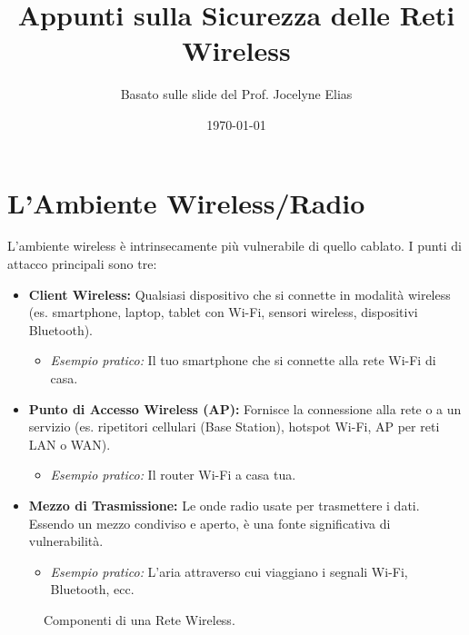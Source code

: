 \documentclass{article}
\title{Appunti sulla Sicurezza delle Reti Wireless}
\author{Basato sulle slide del Prof. Jocelyne Elias}
\date{\today}
\begin{document}
\maketitle
\tableofcontents
\newpage


\section{L'Ambiente Wireless/Radio}
L'ambiente wireless è intrinsecamente più vulnerabile di quello cablato. I punti di attacco principali sono tre:

\begin{itemize}
    \item \textbf{Client Wireless:} Qualsiasi dispositivo che si connette in modalità wireless (es. smartphone, laptop, tablet con Wi-Fi, sensori wireless, dispositivi Bluetooth).
    \begin{itemize}
        \item \textit{Esempio pratico:} Il tuo smartphone che si connette alla rete Wi-Fi di casa.
    \end{itemize}
    \item \textbf{Punto di Accesso Wireless (AP):} Fornisce la connessione alla rete o a un servizio (es. ripetitori cellulari (Base Station), hotspot Wi-Fi, AP per reti LAN o WAN).
    \begin{itemize}
        \item \textit{Esempio pratico:} Il router Wi-Fi a casa tua.
    \end{itemize}
    \item \textbf{Mezzo di Trasmissione:} Le onde radio usate per trasmettere i dati. Essendo un mezzo condiviso e aperto, è una fonte significativa di vulnerabilità.
    \begin{itemize}
        \item \textit{Esempio pratico:} L'aria attraverso cui viaggiano i segnali Wi-Fi, Bluetooth, ecc.
    \end{itemize}
\end{itemize}

\begin{figure}[H]
    \centering
    \caption{Componenti di una Rete Wireless.}
    \label{fig:wireless_components}
\end{figure}
\end{document}
